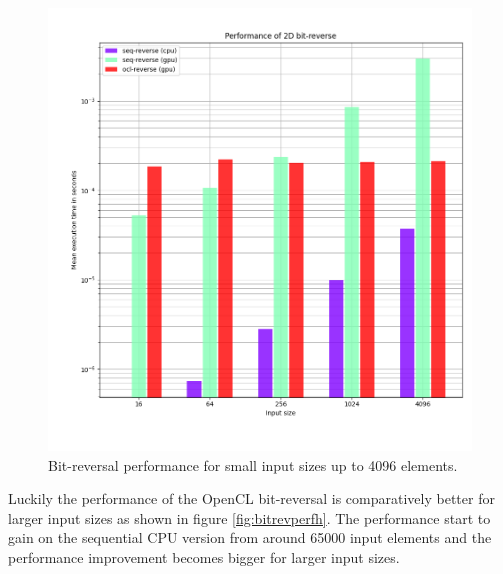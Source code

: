 \documentclass[conference]{IEEEtran}
\begin{document}
\begin{figure}[h]
	\centering
	\includegraphics[width=1\linewidth]{resources/images/bit-reverse-cl-low.png}
	\caption{Bit-reversal performance for small input sizes up to 4096 elements.}
	\label{fig:bitrevperf}
\end{figure}

Luckily the performance of the OpenCL bit-reversal is comparatively better for
larger input sizes as shown in figure \ref{fig:bitrevperfh}. The performance
start to gain on the sequential CPU version from around 65000 input elements
and the performance improvement becomes bigger for larger input sizes.
\end{document}
